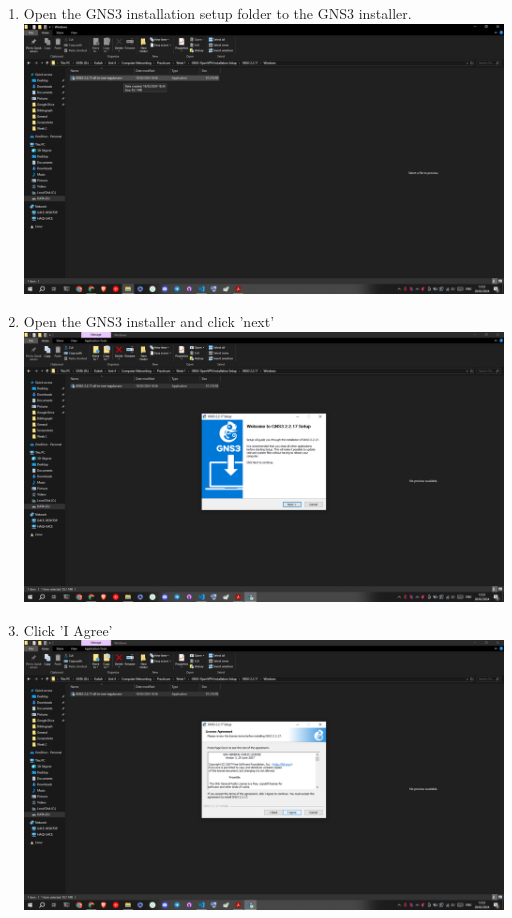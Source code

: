 \documentclass[12pt,titlepage]{article}
\begin{document}
\begin{enumerate}
    \item Open the GNS3 installation setup folder to the GNS3 installer. \\ \includegraphics[width=.9\textwidth]{images/figures/Screenshot (422).png}
    \item Open the GNS3 installer and click 'next' \\ \includegraphics[width=.9\textwidth]{images/figures/Screenshot (423).png}
    \newpage
    \item Click 'I Agree' \\ \includegraphics[width=.9\textwidth]{images/figures/Screenshot (424).png}

\end{enumerate}
\end{document}
